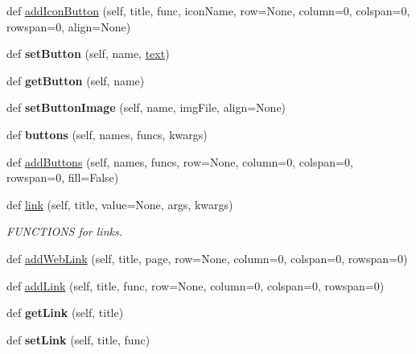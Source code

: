 \begin{DoxyCompactItemize}
def \hyperlink{classappjar_1_1gui_a045d8548bf48a9838a7248ccae6b91c5}{add\+Icon\+Button} (self, title, func, icon\+Name, row=None, column=0, colspan=0, rowspan=0, align=None)
\item 
\mbox{\label{classappjar_1_1gui_a2a58647c80beb83835f52b3262218b37}} 
def {\bfseries set\+Button} (self, name, \hyperlink{classappjar_1_1gui_a221b516425bf76dd8560ec9f4818182f}{text})
\item 
\mbox{\label{classappjar_1_1gui_a23a57e30da8161cd7c15d6efbd3a8264}} 
def {\bfseries get\+Button} (self, name)
\item 
\mbox{\label{classappjar_1_1gui_aa327aedc5e1c7374486e1b36afcd4a7a}} 
def {\bfseries set\+Button\+Image} (self, name, img\+File, align=None)
\item 
\mbox{\label{classappjar_1_1gui_acd412a3f3ce8a92442cc890ac703c79a}} 
def {\bfseries buttons} (self, names, funcs, kwargs)
\item 
def \hyperlink{classappjar_1_1gui_afc0cb1277159e171b5640069a801a4e6}{add\+Buttons} (self, names, funcs, row=None, column=0, colspan=0, rowspan=0, fill=False)
\item 
def \hyperlink{classappjar_1_1gui_aff45df581ebde9c15f5098e1f88b7d84}{link} (self, title, value=None, args, kwargs)
\begin{DoxyCompactList}\small\item\em F\+U\+N\+C\+T\+I\+O\+NS for links. \end{DoxyCompactList}\item 
def \hyperlink{classappjar_1_1gui_abf8c81f557be8bf534155e768c29ece2}{add\+Web\+Link} (self, title, page, row=None, column=0, colspan=0, rowspan=0)
\item 
def \hyperlink{classappjar_1_1gui_a226308bc36e5801c4ffea3d0ad1df9d4}{add\+Link} (self, title, func, row=None, column=0, colspan=0, rowspan=0)
\item 
\mbox{\label{classappjar_1_1gui_a60c356f209ac23f5f034d89b82a6f9d4}} 
def {\bfseries get\+Link} (self, title)
\item 
\mbox{\label{classappjar_1_1gui_a5e28f441031cc58622ffde1c0795fbd2}} 
def {\bfseries set\+Link} (self, title, func)
\item 

\end{DoxyCompactItemize}
